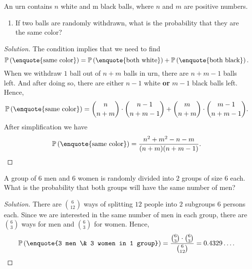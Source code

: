 \documentclass{article}[12pt]
\newenvironment{solution}
  {\renewcommand\qedsymbol{$\blacksquare$}\begin{proof}[Solution]}
  {\end{proof}}
\newenvironment{problem}[1]
  {\renewcommand\theinnercustomprblm{#1}\innercustomprblm}
  {\endinnercustomprblm}
\begin{document}
\begin{problem}{29a}\normalfont
An urn contains $n$ white and m black balls, where $n$ and $m$ are positive numbers.
\begin{enumerate}[label=(\alph*)]
    \item If two balls are randomly withdrawn, what is the probability that they are the same color?
\end{enumerate}
\end{problem}
\begin{solution}
The condition implies that we need to find
\begin{equation*}
    \mathbb{P}\left(\text{\enquote{same color}}\right) = \mathbb{P}\left(\text{\enquote{both white}}\right) + \mathbb{P}\left(\text{\enquote{both black}}\right).
\end{equation*}
When we withdraw $1$ ball out of $n + m$ balls in urn, there are $n + m - 1$ balls left.
And after doing so, there are either $n - 1$ white \textbf{or} $m - 1$ black balls left.
Hence,
\begin{equation*}
    \mathbb{P}\left(\text{\enquote{same color}}\right) = \binom{n}{n+m}\cdot\binom{n-1}{n+m-1} + \binom{m}{n+m}\cdot\binom{m-1}{n+m-1}.
\end{equation*}
After simplification we have
\begin{equation*}
    \mathbb{P}\left(\text{\enquote{same color}}\right) = \dfrac{n^{2} + m^{2} - n - m}{(n + m)(n + m -1)}.
\end{equation*}
\end{solution}

\begin{problem}{49}\normalfont
A group of $6$ men and $6$ women is randomly divided into $2$ groups of size $6$ each. 
What is the probability that both groups will have the same number of men?
\end{problem}
\begin{solution}
There are $\binom{6}{12}$ ways of splitting $12$ people into $2$ subgroups $6$ persons each.
Since we are interested in the same number of men in each group, there are $\binom{6}{3}$ ways for men and $\binom{6}{3}$ for women.
Hence,
\begin{equation*}
    \mathbb{P}\left(\text{\enquote{3 men \& 3 women in 1 group}}\right) = \dfrac{\binom{6}{3}\cdot\binom{6}{3}}{\binom{6}{12}} = 0.4329\ldots.
\end{equation*}

\end{solution}
\end{document}
